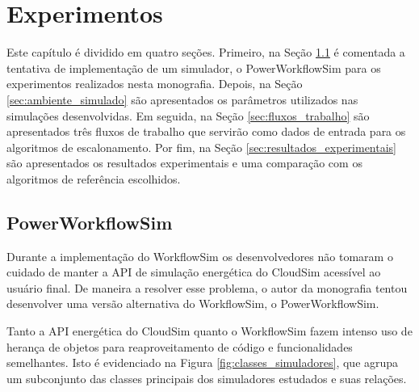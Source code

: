 \chapter{Experimentos}
\label{cap:experimentos}

Este capítulo é dividido em quatro seções. Primeiro, na Seção
\ref{sec:powerworkflowsim} é comentada a tentativa de implementação de um
simulador, o PowerWorkflowSim para os experimentos realizados nesta monografia.
Depois, na Seção \ref{sec:ambiente_simulado} são apresentados os parâmetros
utilizados nas simulações desenvolvidas. Em seguida, na Seção
\ref{sec:fluxos_trabalho} são apresentados três fluxos de trabalho que servirão
como dados de entrada para os algoritmos de escalonamento. Por fim, na Seção
\ref{sec:resultados_experimentais} são apresentados os resultados experimentais
e uma comparação com os algoritmos de referência escolhidos.


\section{PowerWorkflowSim}
\label{sec:powerworkflowsim}

Durante a implementação do WorkflowSim os desenvolvedores não tomaram o cuidado
de manter a API de simulação energética do CloudSim acessível ao usuário final.
De maneira a resolver esse problema, o autor da monografia tentou desenvolver
uma versão alternativa do WorkflowSim, o PowerWorkflowSim.

Tanto a API energética do CloudSim quanto o WorkflowSim fazem intenso uso de
herança de objetos para reaproveitamento de código e funcionalidades
semelhantes. Isto é evidenciado na Figura \ref{fig:classes_simuladores}, que
agrupa um subconjunto das classes principais dos simuladores estudados e suas
relações.

